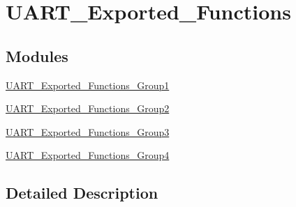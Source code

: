 \hypertarget{group___u_a_r_t___exported___functions}{}\section{U\+A\+R\+T\+\_\+\+Exported\+\_\+\+Functions}
\label{group___u_a_r_t___exported___functions}
\subsection*{Modules}
\begin{DoxyCompactItemize}
\item 
\mbox{\hyperlink{group___u_a_r_t___exported___functions___group1}{U\+A\+R\+T\+\_\+\+Exported\+\_\+\+Functions\+\_\+\+Group1}}
\item 
\mbox{\hyperlink{group___u_a_r_t___exported___functions___group2}{U\+A\+R\+T\+\_\+\+Exported\+\_\+\+Functions\+\_\+\+Group2}}
\item 
\mbox{\hyperlink{group___u_a_r_t___exported___functions___group3}{U\+A\+R\+T\+\_\+\+Exported\+\_\+\+Functions\+\_\+\+Group3}}
\item 
\mbox{\hyperlink{group___u_a_r_t___exported___functions___group4}{U\+A\+R\+T\+\_\+\+Exported\+\_\+\+Functions\+\_\+\+Group4}}
\end{DoxyCompactItemize}


\subsection{Detailed Description}
